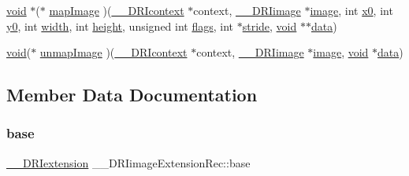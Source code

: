 \begin{DoxyCompactItemize}
\hyperlink{_s_d_l__opengles2__gl2ext_8h_ae5d8fa23ad07c48bb609509eae494c95}{void} $\ast$($\ast$ \hyperlink{struct_____d_r_iimage_extension_rec_abdb0fc20bc51e7b9d7b651cf89f922e5}{map\+Image} )(\hyperlink{dri__interface_8h_a3fd295cba82b5a3d79f1ee7e12bfb908}{\+\_\+\+\_\+\+D\+R\+Icontext} $\ast$context, \hyperlink{dri__interface_8h_a37e0407153595dc88fe5d25127645cf1}{\+\_\+\+\_\+\+D\+R\+Iimage} $\ast$\hyperlink{gl_8h_a0a221b005894579fea3b9eb7bfc2ee71}{image}, int \hyperlink{glext_8h_a98ac434677655cc8438bb72de2719f39}{x0}, int \hyperlink{glext_8h_ae7f97ed6c9c8e502fcbc44c7cb8a8312}{y0}, int \hyperlink{gl_8h_a9a82cf3caff84cabc4598e2619faac17}{width}, int \hyperlink{gl_8h_aa352f2804b9902ac30769c00dde75d5f}{height}, unsigned int \hyperlink{glcorearb_8h_ac7ba7d3cce3d19ca020e056b37231289}{flags}, int $\ast$\hyperlink{glcorearb_8h_a743715bb319dd426e85b9774559cc0ea}{stride}, \hyperlink{_s_d_l__opengles2__gl2ext_8h_ae5d8fa23ad07c48bb609509eae494c95}{void} $\ast$$\ast$\hyperlink{gl_8h_a2e335d56e2846b0fea47eed068b2d34a}{data})
\item 
\hyperlink{_s_d_l__opengles2__gl2ext_8h_ae5d8fa23ad07c48bb609509eae494c95}{void}($\ast$ \hyperlink{struct_____d_r_iimage_extension_rec_abd0d8c26cfced376ff7b8c31699570cf}{unmap\+Image} )(\hyperlink{dri__interface_8h_a3fd295cba82b5a3d79f1ee7e12bfb908}{\+\_\+\+\_\+\+D\+R\+Icontext} $\ast$context, \hyperlink{dri__interface_8h_a37e0407153595dc88fe5d25127645cf1}{\+\_\+\+\_\+\+D\+R\+Iimage} $\ast$\hyperlink{gl_8h_a0a221b005894579fea3b9eb7bfc2ee71}{image}, \hyperlink{_s_d_l__opengles2__gl2ext_8h_ae5d8fa23ad07c48bb609509eae494c95}{void} $\ast$\hyperlink{gl_8h_a2e335d56e2846b0fea47eed068b2d34a}{data})
\end{DoxyCompactItemize}


\subsection{Member Data Documentation}
\mbox{\label{struct_____d_r_iimage_extension_rec_a0705eddcc3909eb2c216213a4ba74040}} 
\subsubsection{\texorpdfstring{base}{base}}
{\footnotesize\ttfamily \hyperlink{dri__interface_8h_a4e0a61c8ece00d2b2c6792a9a1b55385}{\+\_\+\+\_\+\+D\+R\+Iextension} \+\_\+\+\_\+\+D\+R\+Iimage\+Extension\+Rec\+::base}


